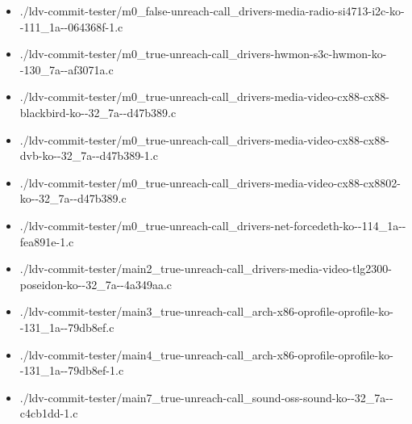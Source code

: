 \documentclass[envcountsame]{llncs}
\begin{document}
\begin{itemize}
\item ./ldv-commit-tester/m0\_false-unreach-call\_drivers-media-radio-si4713-i2c-ko-{}-111\_1a-{}-064368f-1.c
\item ./ldv-commit-tester/m0\_true-unreach-call\_drivers-hwmon-s3c-hwmon-ko-{}-130\_7a-{}-af3071a.c
\item ./ldv-commit-tester/m0\_true-unreach-call\_drivers-media-video-cx88-cx88-blackbird-ko-{}-32\_7a-{}-d47b389.c
\item ./ldv-commit-tester/m0\_true-unreach-call\_drivers-media-video-cx88-cx88-dvb-ko-{}-32\_7a-{}-d47b389-1.c
\item ./ldv-commit-tester/m0\_true-unreach-call\_drivers-media-video-cx88-cx8802-ko-{}-32\_7a-{}-d47b389.c
\item ./ldv-commit-tester/m0\_true-unreach-call\_drivers-net-forcedeth-ko-{}-114\_1a-{}-fea891e-1.c
\item ./ldv-commit-tester/main2\_true-unreach-call\_drivers-media-video-tlg2300-poseidon-ko-{}-32\_7a-{}-4a349aa.c
\item ./ldv-commit-tester/main3\_true-unreach-call\_arch-x86-oprofile-oprofile-ko-{}-131\_1a-{}-79db8ef.c
\item ./ldv-commit-tester/main4\_true-unreach-call\_arch-x86-oprofile-oprofile-ko-{}-131\_1a-{}-79db8ef-1.c
\item ./ldv-commit-tester/main7\_true-unreach-call\_sound-oss-sound-ko-{}-32\_7a-{}-c4cb1dd-1.c



\end{itemize}
\end{document}
